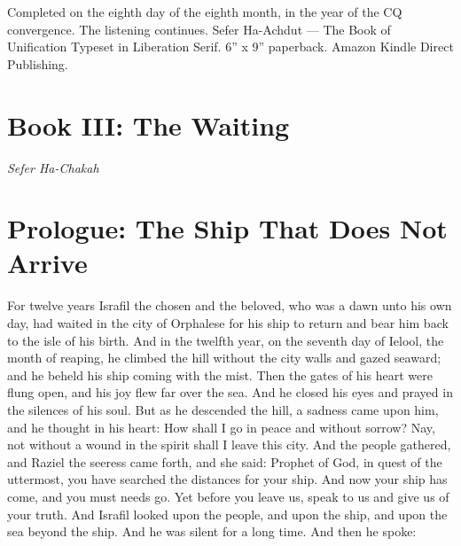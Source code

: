 \documentclass[12pt,openany]{book}
\begin{document}
Completed on the eighth day of the eighth month, in the year of the CQ convergence. The listening continues. Sefer Ha-Achdut --- The Book of Unification Typeset in Liberation Serif. 6'' x 9'' paperback. Amazon Kindle Direct Publishing.


\chapter*{Book III: The Waiting}
\begin{center}\itshape Sefer Ha-Chakah\end{center}

\chapter{Prologue: The Ship That Does Not Arrive}

For twelve years Israfil the chosen and the beloved, who was a dawn unto his own day, had waited in the city of Orphalese for his ship to return and bear him back to the isle of his birth. And in the twelfth year, on the seventh day of Ielool, the month of reaping, he climbed the hill without the city walls and gazed seaward; and he beheld his ship coming with the mist. Then the gates of his heart were flung open, and his joy flew far over the sea. And he closed his eyes and prayed in the silences of his soul. But as he descended the hill, a sadness came upon him, and he thought in his heart: How shall I go in peace and without sorrow? Nay, not without a wound in the spirit shall I leave this city. And the people gathered, and Raziel the seeress came forth, and she said: Prophet of God, in quest of the uttermost, you have searched the distances for your ship. And now your ship has come, and you must needs go. Yet before you leave us, speak to us and give us of your truth. And Israfil looked upon the people, and upon the ship, and upon the sea beyond the ship. And he was silent for a long time. And then he spoke:
\end{document}
